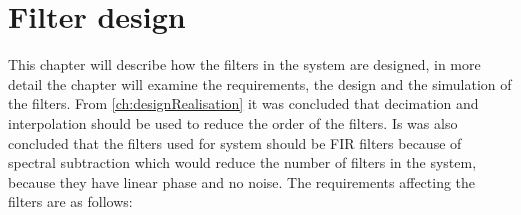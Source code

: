 \chapter{Filter design}
This chapter will describe how the filters in the system are designed, in more detail the chapter will examine the requirements, the design and the simulation of the filters. From \autoref{ch:designRealisation} it was concluded that decimation and interpolation should be used to reduce the order of the filters.  
Is was also concluded that the filters used for system should be FIR filters because of spectral subtraction which would reduce the number of filters in the system, because they have linear phase and no noise. The requirements affecting the filters are as follows:   





%

%

%